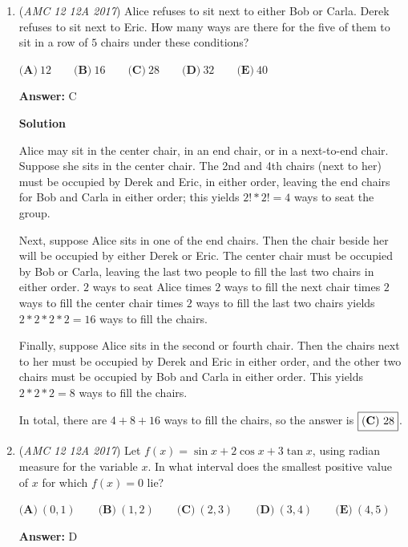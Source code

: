 \begin{enumerate}
 Solving equation, we get $x=135$ $\Longrightarrow \boxed{B}$.

 


	\item (\textit{AMC 12 12A 2017}) Alice refuses to sit next to either Bob or Carla. Derek refuses to sit next to Eric. How many ways are there for the five of them to sit in a row of $5$ chairs under these conditions?


 $\textbf{(A)}\ 12  \qquad \textbf{(B)}\ 16 \qquad\textbf{(C)}\ 28 \qquad\textbf{(D)}\ 32 \qquad\textbf{(E)}\ 40$

 \textbf{Answer: }C



\textbf{Solution}

Alice may sit in the center chair, in an end chair, or in a next-to-end chair. Suppose she sits in the center chair. The 2nd and 4th chairs (next to her) must be occupied by Derek and Eric, in either order, leaving the end chairs for Bob and Carla in either order; this yields $2! * 2! = 4$ ways to seat the group.

 Next, suppose Alice sits in one of the end chairs. Then the chair beside her will be occupied by either Derek or Eric. The center chair must be occupied by Bob or Carla, leaving the last two people to fill the last two chairs in either order. $2$ ways to seat Alice times $2$ ways to fill the next chair times $2$ ways to fill the center chair times $2$ ways to fill the last two chairs yields $2 * 2 * 2 * 2 = 16$ ways to fill the chairs.

 Finally, suppose Alice sits in the second or fourth chair. Then the chairs next to her must be occupied by Derek and Eric in either order, and the other two chairs must be occupied by Bob and Carla in either order. This yields $2 * 2 * 2 = 8$ ways to fill the chairs. 

 In total, there are $4 + 8 + 16$ ways to fill the chairs, so the answer is $\boxed{\bold{(C)}\ 28}$.

 


	\item (\textit{AMC 12 12A 2017}) Let $f(x) = \sin{x} + 2\cos{x} + 3\tan{x}$, using radian measure for the variable $x$. In what interval does the smallest positive value of $x$ for which $f(x) = 0$ lie?


 $\textbf{(A)}\ (0,1)  \qquad \textbf{(B)}\ (1, 2) \qquad\textbf{(C)}\ (2, 3) \qquad\textbf{(D)}\ (3, 4) \qquad\textbf{(E)}\ (4,5)$

 \textbf{Answer: }D




\end{enumerate}
